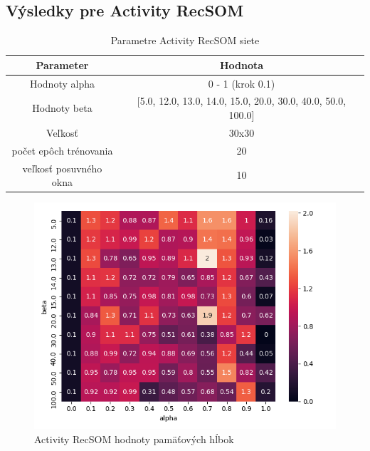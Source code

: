 \subsection{Výsledky pre Activity RecSOM}

\begin{table}[h!]
    \centering
    \begin{tabular}{|c|c|} 
     \hline
     Parameter & Hodnota \\ 
     \hline\hline
     Hodnoty alpha & 0 - 1 (krok 0.1) \\ 
     \hline
     Hodnoty beta & [5.0, 12.0, 13.0, 14.0, 15.0, 20.0, 30.0, 40.0, 50.0, 100.0]\\ 
     \hline
     Veľkosť & 30x30  \\
     \hline
     počet epôch trénovania & 20  \\
     \hline
     veľkosť posuvného okna & 10  \\
     \hline
    \end{tabular}
    \caption{Parametre Activity RecSOM siete}
    \label{table:1}
    \end{table}
    
    \begin{figure}[H]
        \centering
        \includegraphics[width=\textwidth]{assets/ar_memory_span}
        \caption{Activity RecSOM hodnoty pamäťových hĺbok}
        \label{memory_span_activity_recsom}
    \end{figure}
    
